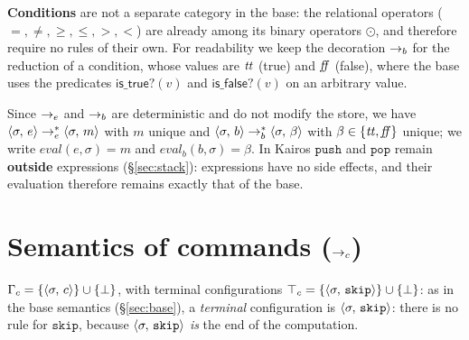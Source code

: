 \medskip
\noindent
\textbf{Conditions} are not a separate category in the base: the relational
operators ($=,\neq,\geq,\leq,>,<$) are already among its binary
operators $\odot$, and therefore require no rules of their own. For
readability we keep the decoration $\to_b$ for the reduction of a condition, whose
values are $\mathit{tt}$ (true) and $\mathit{ff}$ (false), where the base uses the predicates
$\mathsf{is\_true?}(v)$ and $\mathsf{is\_false?}(v)$ on an arbitrary value.

\medskip
\noindent
Since $\to_e$ and $\to_b$ are deterministic and do not modify the store, we have
$\langle \sigma,\, e \rangle \to_e^{*} \langle \sigma,\, m \rangle$ with $m$ unique and
$\langle \sigma,\, b \rangle \to_b^{*} \langle \sigma,\, \beta \rangle$ with $\beta \in \{\mathit{tt},\mathit{ff}\}$
unique; we write $\mathit{eval}(e,\sigma) = m$ and
$\mathit{eval}_b(b,\sigma) = \beta$. In Kairos $\mathtt{push}$ and
$\mathtt{pop}$ remain \textbf{outside} expressions
(\S\ref{sec:stack}): expressions have no side effects, and their
evaluation therefore remains exactly that of the base.

\section{Semantics of commands ($\to_c$)}
\label{sec:cmd}

$\Gamma_c = \{\langle \sigma,\, c \rangle\} \cup \{\bot\}$, with terminal configurations
$\top_c = \{\langle \sigma,\, \mathtt{skip} \rangle\} \cup \{\bot\}$: as in the base
semantics (\S\ref{sec:base}), a \emph{terminal} configuration is
$\langle \sigma,\, \mathtt{skip} \rangle$: there is no rule for $\mathtt{skip}$,
because $\langle \sigma,\, \mathtt{skip} \rangle$ \emph{is} the end of the computation.

